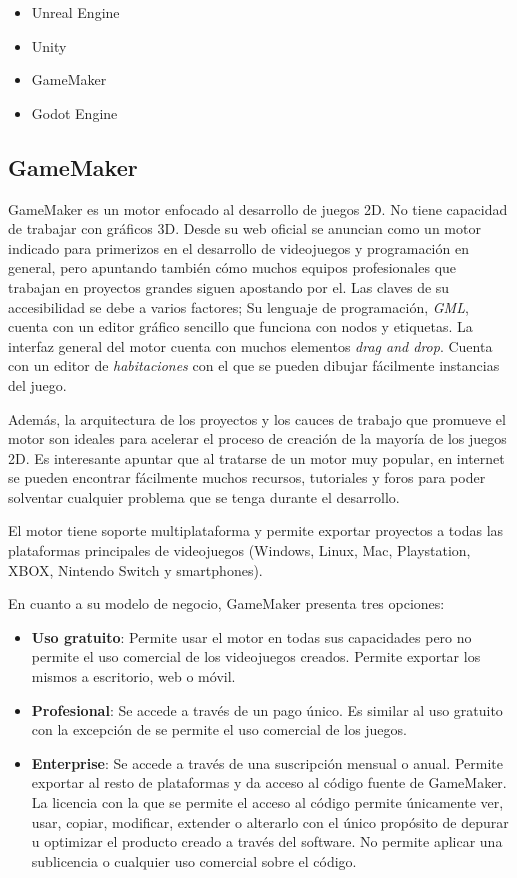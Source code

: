 \begin{itemize}
    \item Unreal Engine
    \item Unity
    \item GameMaker
    \item Godot Engine
\end{itemize}

\subsection{GameMaker}

GameMaker\cite{gamemaker} es un motor enfocado al desarrollo de juegos 2D. No tiene capacidad de trabajar con gráficos 3D. Desde su web oficial se anuncian como un motor indicado para primerizos en el desarrollo de videojuegos y programación en general, pero apuntando también cómo muchos equipos profesionales que trabajan en proyectos grandes siguen apostando por el. Las claves de su accesibilidad se debe a varios factores; Su lenguaje de programación, \textit{GML}, cuenta con un editor gráfico sencillo que funciona con nodos y etiquetas. La interfaz general del motor cuenta con muchos elementos \textit{drag and drop}. Cuenta con un editor de \textit{habitaciones} con el que se pueden dibujar fácilmente instancias del juego.

Además, la arquitectura de los proyectos y los cauces de trabajo que promueve el motor son ideales para acelerar el proceso de creación de la mayoría de los juegos 2D. Es interesante apuntar que al tratarse de un motor muy popular, en internet se pueden encontrar fácilmente muchos recursos, tutoriales y foros para poder solventar cualquier problema que se tenga durante el desarrollo.

El motor tiene soporte multiplataforma y permite exportar proyectos a todas las plataformas principales de videojuegos (Windows, Linux, Mac, Playstation, XBOX, Nintendo Switch y smartphones).

En cuanto a su modelo de negocio, GameMaker presenta tres opciones:

\begin{itemize}
    \item \textbf{Uso gratuito}: Permite usar el motor en todas sus capacidades pero no permite el uso comercial de los videojuegos creados. Permite exportar los mismos a escritorio, web o móvil.
    \item \textbf{Profesional}: Se accede a través de un pago único. Es similar al uso gratuito con la excepción de se permite el uso comercial de los juegos.
    \item \textbf{Enterprise}: Se accede a través de una suscripción mensual o anual. Permite exportar al resto de plataformas y da acceso al código fuente de GameMaker. La licencia con la que se permite el acceso al código permite únicamente ver, usar, copiar, modificar, extender o alterarlo con el único propósito de depurar u optimizar el producto creado a través del software. No permite aplicar una sublicencia o cualquier uso comercial sobre el código.
\end{itemize}

